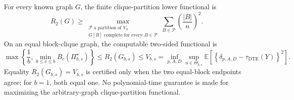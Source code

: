 For every known graph \(G\), the finite clique-partition lower functional is \[R_2(G)\geq\max_{\substack{\mathcal P\text{ a partition of }V_n\\G[B]\text{ complete for every }B\in\mathcal P}}\sum_{B\in\mathcal P}\left(\frac{|B|}{n}\right)^2.\] On an equal block-clique graph, the computable two-sided functional is \[\max\left\{\frac1b,\min_{0\leq c\leq b}B_c(\Pi_{b,s}^{\star})\right\}\leq R_2(G_{b,s})\leq V_{b,s}=\inf_{p,A,D}\sup_{u\in\Theta_{b,s}}\mathbb E\!\left[\left\{\delta_{p,A,D}-\tau_{\mathrm{DTE}}(Y)\right\}^2\right].\] Equality \(R_2(G_{b,s})=V_{b,s}\) is certified only when the two equal-block endpoints agree; for \(b=1\), both equal one. No polynomial-time guarantee is made for maximizing the arbitrary-graph clique-partition functional.